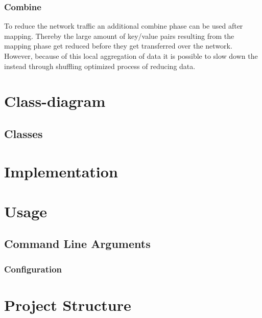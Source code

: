 \documentclass[12pt, letterpaper]{article}
\begin{document}
\subsubsection{Combine}
To reduce the network traffic an additional combine phase can be used after mapping. Thereby the large amount of key/value pairs resulting from the mapping phase get reduced before they get transferred over the network. However, because of this local aggregation of data it is possible to slow down the instead through shuffling optimized process of reducing data.

\section{Class-diagram}


\subsection{Classes}


\section{Implementation}


\section{Usage}
\label{usage}

\subsection{Command Line Arguments}

\subsubsection{Configuration}


\newpage

\section{Project Structure}


\newpage

\printbibliography
\end{document}
